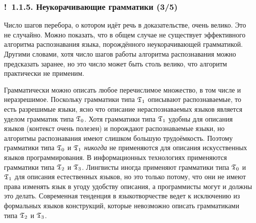 \documentclass[mathserif,12pt,aspectratio=169]{beamer}
\def\emразделенной{\em разделенной}
\def\em#1{\it\color{blue}#1}
\def\Ok{{\color{green}\textbf{!}\ }}
\begin{document}
\begin{frame}
\frametitle{\Ok 1.1.5. Неукорачивающие грамматики (3/5)}
\begin{remark}
Число шагов перебора,
о котором идёт речь в доказательстве,
очень велико.
Это не случайно.
Можно показать, что в общем случае не существует эффективного
алгоритма распознавания языка, порождённого неукорачивающей
грамматикой. Другими словами, хотя число шагов работы алгоритма
распознавания можно предсказать заранее, но это число
может быть столь велико, что алгоритм практически не применим.
\end{remark}


\begin{digress}
Грамматически можно
описать любое перечислимое множество, в том числе и неразрешимое.
Поскольку грамматики типа $\frak{T}_1$ описывают распознаваемые, то есть
разрешимые языки, ясно что описание нераспознаваемых языков
является уделом грамматик типа $\frak{T}_0$. Хотя грамматики типа $\frak{T}_1$
удобны для описания языков (контекст очень полезен)
и порождают распознаваемые языки,
но алгоритмы распознавания имеют слишком
большую трудоёмкость. Поэтому грамматики
типа $\frak{T}_0$ и $\frak{T}_1$ {\em никогда} не применяются для описания
искусственных языков программирования.
В информационных технологиях
применяются грамматики типа $\frak{T}_2$ и $\frak{T}_3$.
Лингвисты иногда применяют грамматики
типа $\frak{T}_0$ и $\frak{T}_1$ для описания естественных языков,
но это только потому, что они не имеют права
изменять язык в угоду удобству описания,
а программисты могут и должны это делать.
Современная тенденция в языкотворчестве
ведет к исключению из формальных языков конструкций,
которые невозможно описать грамматиками типа $\frak{T}_2$ и $\frak{T}_3$.
\end{digress}

\end{frame}
\end{document}
